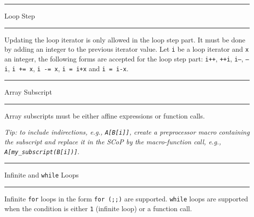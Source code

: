 \documentclass[landscape,a4paper]{article}
\def\titre#1{\begin{center}\hrule\vspace{0.1cm}#1
\vspace{0.07cm}\hrule\end{center}}
\begin{document}
\begin{multicols}{3}
\titre{Loop Step}

\begin{small}
Updating the loop iterator is only allowed in the loop step part.
It must be done by adding an integer to the previous
iterator value. Let {\tt i} be a loop iterator and {\tt x} an integer,
the following forms are accepted for the loop step part:
{\tt i++}, {\tt ++i}, {\tt i---}, {\tt ---i}, {\tt i += x}, {\tt i -= x}, {\tt i = i+x} and
{\tt i = i-x}.
\end{small}

\titre{Array Subscript}

\begin{small}
Array subscripts must be either affine expressions or function calls.

\vspace{0.3cm}
\textit{Tip: to include indirections, e.g., {\tt A[B[i]]}, create a
preprocessor macro containing the subscript and replace it in the SCoP by
the macro-function call, e.g., {\tt A[my\_subscript(B[i])]}}.
\end{small}

\titre{Infinite and {\tt while} Loops}

\begin{small}
Infinite {\tt for} loops in the form {\tt for (;;)} are supported.
{\tt while} loops are supported when the condition is either {\tt 1}
(infinite loop) or a function call.
\end{small}

\end{multicols}
\end{document}
